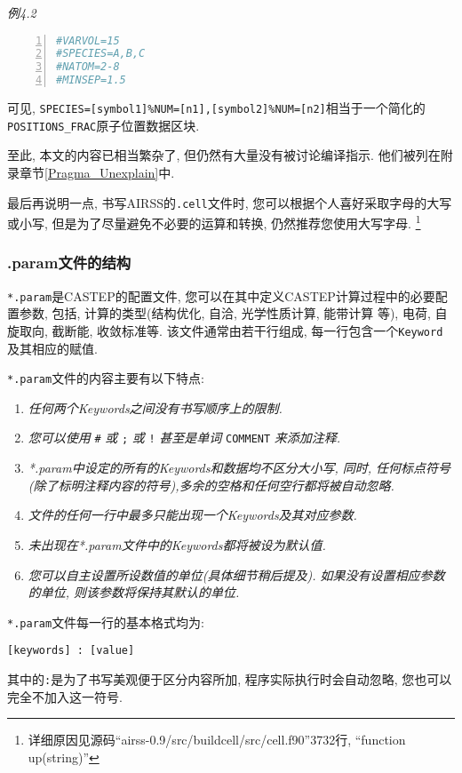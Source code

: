 \documentclass[a4paper, 10pt]{article}
\begin{document}
       \emph{例4.2}
       \begin{lstlisting}[language={bash},numbers=left]
#VARVOL=15 
#SPECIES=A,B,C
#NATOM=2-8
#MINSEP=1.5        
       \end{lstlisting}

       可见, \verb|SPECIES=[symbol1]%NUM=[n1],[symbol2]%NUM=[n2]|相当于一个简化的\verb|POSITIONS_FRAC|原子位置数据区块.
 

      至此, 本文的内容已相当繁杂了, 但仍然有大量没有被讨论编译指示. 他们被列在附录章节\ref{Pragma_Unexplain}中.

      最后再说明一点, 书写AIRSS的\verb|.cell|文件时, 您可以根据个人喜好采取字母的大写或小写, 但是为了尽量避免不必要的运算和转换, 仍然推荐您使用大写字母. \footnote{详细原因见源码``airss-0.9/src/buildcell/src/cell.f90''3732行, ``function up(string)''}

      \subsubsection{.param文件的结构}
      \verb|*.param|是CASTEP的配置文件, 您可以在其中定义CASTEP计算过程中的必要配置参数, 包括, 计算的类型(结构优化, 自洽, 光学性质计算, 能带计算 等), 电荷, 自旋取向, 截断能, 收敛标准等. 该文件通常由若干行组成, 每一行包含一个\verb|Keyword|及其相应的赋值.
        
        \verb|*.param|文件的内容主要有以下特点:
        \begin{enumerate}[(1)]
          \item   \emph{任何两个Keywords之间没有书写顺序上的限制.}
          \item   \emph{您可以使用} \verb|#| \emph{或} \verb|;| \emph{或} \verb|!| \emph{甚至是单词} \verb|COMMENT| \emph{来添加注释.}
          \item   \emph{*.param中设定的所有的Keywords和数据均不区分大小写, 同时, 任何标点符号(除了标明注释内容的符号),多余的空格和任何空行都将被自动忽略.}
          \item   \emph{文件的任何一行中最多只能出现一个Keywords及其对应参数.}
          \item   \emph{未出现在*.param文件中的Keywords都将被设为默认值.}
          \item   \emph{您可以自主设置所设数值的单位(具体细节稍后提及). 如果没有设置相应参数的单位, 则该参数将保持其默认的单位.}
        \end{enumerate}

        \verb|*.param|文件每一行的基本格式均为:
        \begin{lstlisting}[numbers=right]
[keywords] : [value]
        \end{lstlisting}
        其中的\verb|:|是为了书写美观便于区分内容所加, 程序实际执行时会自动忽略, 您也可以完全不加入这一符号.
\end{document}
